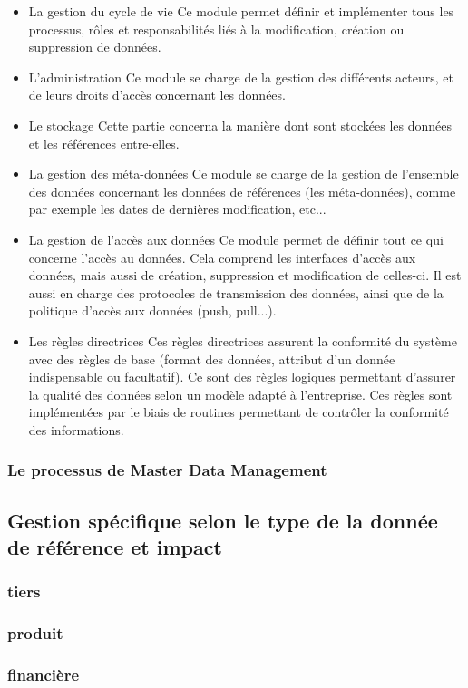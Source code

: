 \begin{itemize}

\item{La gestion du cycle de vie}
Ce module permet définir et implémenter tous les processus, rôles et responsabilités liés à la modification, création ou suppression de données.

\item{L'administration}
Ce module se charge de la gestion des différents acteurs, et de leurs droits d'accès concernant les données.

\item{Le stockage}
Cette partie concerna la manière dont sont stockées les données et les références entre-elles.

\item{La gestion des méta-données}
Ce module se charge de la gestion de l'ensemble des données concernant les données de références (les méta-données), comme par exemple les dates de dernières modification, etc...

\item{La gestion de l'accès aux données}
Ce module permet de définir tout ce qui concerne l'accès au données. Cela comprend les interfaces d'accès aux données, mais aussi de création, suppression et modification de celles-ci. Il est aussi en charge des protocoles de transmission des données, ainsi que de la politique d'accès aux données (push, pull...).

\item{Les règles directrices}
Ces règles directrices assurent la conformité du système avec des règles de base (format des données, attribut d'un donnée indispensable ou facultatif). Ce sont des règles logiques permettant d'assurer la qualité des données selon un modèle adapté à l'entreprise. Ces règles sont implémentées par le biais de routines permettant de contrôler la conformité des informations.

\end{itemize}

\subsubsection{Le processus de Master Data Management}

\subsection{Gestion spécifique selon le type de la donnée de référence et impact}

\subsubsection{tiers}

\subsubsection{produit}

\subsubsection{financière}



